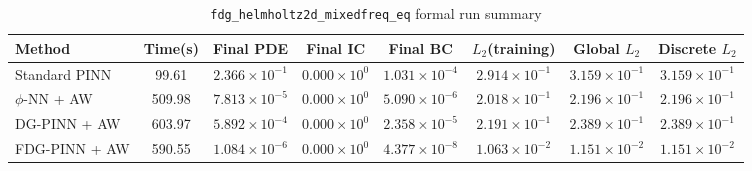\begin{table}[h]
\centering
\caption{\texttt{fdg\_helmholtz2d\_mixedfreq\_eq} formal run summary}
\begin{adjustbox}{max width=\textwidth}
\scriptsize
\begin{tabular}{lccccccc}
\toprule
Method & Time(s) & Final PDE & Final IC & Final BC & $L_2$(training) & Global $L_2$ & Discrete $L_2$ \\
\midrule
Standard PINN & 99.61 & $2.366\times10^{-1}$ & $0.000\times10^{0}$ & $1.031\times10^{-4}$ & $2.914\times10^{-1}$ & $3.159\times10^{-1}$ & $3.159\times10^{-1}$ \\
$\phi$-NN + AW & 509.98 & $7.813\times10^{-5}$ & $0.000\times10^{0}$ & $5.090\times10^{-6}$ & $2.018\times10^{-1}$ & $2.196\times10^{-1}$ & $2.196\times10^{-1}$ \\
DG-PINN + AW & 603.97 & $5.892\times10^{-4}$ & $0.000\times10^{0}$ & $2.358\times10^{-5}$ & $2.191\times10^{-1}$ & $2.389\times10^{-1}$ & $2.389\times10^{-1}$ \\
FDG-PINN + AW & 590.55 & $1.084\times10^{-6}$ & $0.000\times10^{0}$ & $4.377\times10^{-8}$ & $1.063\times10^{-2}$ & $1.151\times10^{-2}$ & $1.151\times10^{-2}$ \\
\bottomrule
\end{tabular}
\end{adjustbox}
\end{table}
